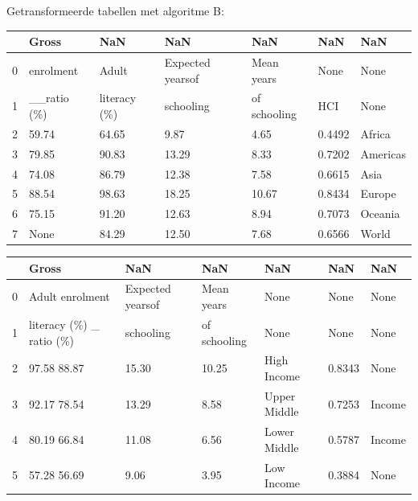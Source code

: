 Getransformeerde tabellen met algoritme B:

\begin{tabular}{lllllll}
\toprule
{} &        Gross &           NaN &               NaN &           NaN &     NaN &       NaN \\
\midrule
0 &    enrolment &         Adult &  Expected yearsof &    Mean years &    None &      None \\
1 &  \_\_ratio (\%) &  literacy (\%) &         schooling &  of schooling &     HCI &      None \\
2 &        59.74 &         64.65 &              9.87 &          4.65 &  0.4492 &    Africa \\
3 &        79.85 &         90.83 &             13.29 &          8.33 &  0.7202 &  Americas \\
4 &        74.08 &         86.79 &             12.38 &          7.58 &  0.6615 &      Asia \\
5 &        88.54 &         98.63 &             18.25 &         10.67 &  0.8434 &    Europe \\
6 &        75.15 &         91.20 &             12.63 &          8.94 &  0.7073 &   Oceania \\
7 &         None &         84.29 &             12.50 &          7.68 &  0.6566 &     World \\
\bottomrule
\end{tabular}

\begin{tabular}{lllllll}
\toprule
{} &                     Gross &               NaN &           NaN &           NaN &     NaN &     NaN \\
\midrule
0 &           Adult enrolment &  Expected yearsof &    Mean years &          None &    None &    None \\
1 &  literacy (\%) \_ ratio (\%) &         schooling &  of schooling &          None &    None &    None \\
2 &               97.58 88.87 &             15.30 &         10.25 &   High Income &  0.8343 &    None \\
3 &               92.17 78.54 &             13.29 &          8.58 &  Upper Middle &  0.7253 &  Income \\
4 &               80.19 66.84 &             11.08 &          6.56 &  Lower Middle &  0.5787 &  Income \\
5 &               57.28 56.69 &              9.06 &          3.95 &    Low Income &  0.3884 &    None \\
\bottomrule
\end{tabular}

